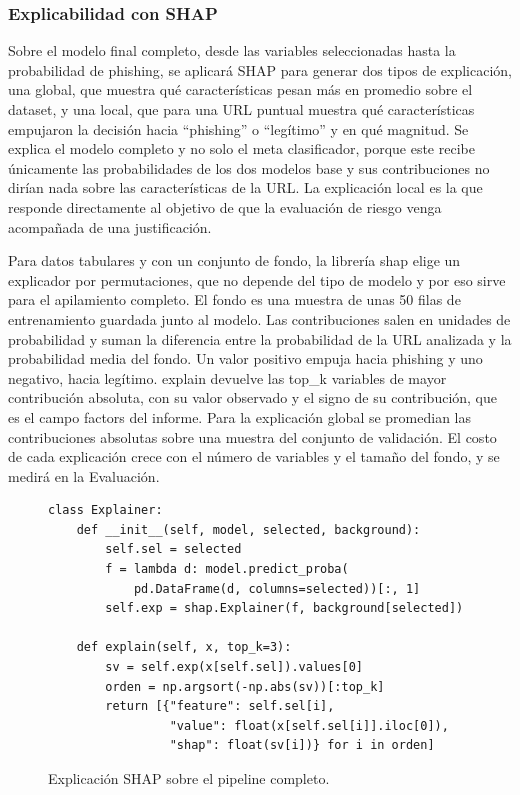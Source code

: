 \subsubsection{Explicabilidad con SHAP}

Sobre el modelo final completo, desde las variables seleccionadas hasta la probabilidad de phishing, se aplicará SHAP para generar dos tipos de explicación, una global, que muestra qué características pesan más en promedio sobre el dataset, y una local, que para una URL puntual muestra qué características empujaron la decisión hacia ``phishing'' o ``legítimo'' y en qué magnitud. Se explica el modelo completo y no solo el meta clasificador, porque este recibe únicamente las probabilidades de los dos modelos base y sus contribuciones no dirían nada sobre las características de la URL. La explicación local es la que responde directamente al objetivo de que la evaluación de riesgo venga acompañada de una justificación. \newline

Para datos tabulares y con un conjunto de fondo, la librería shap elige un explicador por permutaciones, que no depende del tipo de modelo y por eso sirve para el apilamiento completo. El fondo es una muestra de unas 50 filas de entrenamiento guardada junto al modelo. Las contribuciones salen en unidades de probabilidad y suman la diferencia entre la probabilidad de la URL analizada y la probabilidad media del fondo. Un valor positivo empuja hacia phishing y uno negativo, hacia legítimo. explain devuelve las top\_k variables de mayor contribución absoluta, con su valor observado y el signo de su contribución, que es el campo factors del informe. Para la explicación global se promedian las contribuciones absolutas sobre una muestra del conjunto de validación. El costo de cada explicación crece con el número de variables y el tamaño del fondo, y se medirá en la Evaluación. \newline

\begin{figure}[ht]
\begin{lstlisting}
class Explainer:
    def __init__(self, model, selected, background):
        self.sel = selected
        f = lambda d: model.predict_proba(
            pd.DataFrame(d, columns=selected))[:, 1]
        self.exp = shap.Explainer(f, background[selected])

    def explain(self, x, top_k=3):
        sv = self.exp(x[self.sel]).values[0]
        orden = np.argsort(-np.abs(sv))[:top_k]
        return [{"feature": self.sel[i],
                 "value": float(x[self.sel[i]].iloc[0]),
                 "shap": float(sv[i])} for i in orden]
\end{lstlisting}
\caption{Explicación SHAP sobre el pipeline completo.}
\label{lst:shap}
\end{figure}


